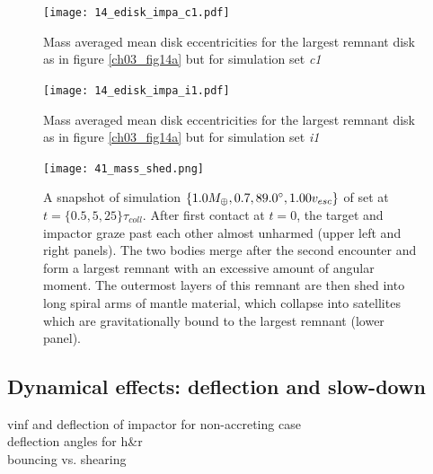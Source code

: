 {\begin{landscape}
\begin{figure}
\begin{center}
\texttt{[image: 14\_edisk\_impa\_c1.pdf]}
\caption{Mass averaged mean disk eccentricities for the largest remnant disk as in figure \ref{ch03_fig14a} but for simulation set \emph{c1}}
\label{ch03_fig14b}
\end{center}
\end{figure}

\begin{figure}
\begin{center}
\texttt{[image: 14\_edisk\_impa\_i1.pdf]}
\caption{Mass averaged mean disk eccentricities for the largest remnant disk as in figure \ref{ch03_fig14a} but for simulation set \emph{i1}}
\label{ch03_fig14c}
\end{center}
\end{figure}
\end{landscape}
}

\begin{figure}[h!]
\begin{center}
\texttt{[image: 41\_mass\_shed.png]}
\caption{A snapshot of simulation $\{ 1.0 M_{\oplus}, 0.7, 89.0 ^\circ, 1.00 v_{esc}\}$ of set \css at $t = \{0.5, 5, 25\} \tau_{coll}$. After first contact at $t = 0$, the target and impactor graze past each other almost unharmed (upper left and right panels). The two bodies merge after the second encounter and form a largest remnant with an excessive amount of angular moment. The outermost layers of this remnant are then shed into long spiral arms of mantle material, which collapse into satellites which are gravitationally bound to the largest remnant (lower panel).}
\label{ch03_fig41}
\end{center}
\end{figure}


\subsection{Dynamical effects: deflection and slow-down}
vinf and deflection of impactor for non-accreting case\\
deflection angles for h\&r \\
bouncing vs. shearing \\

